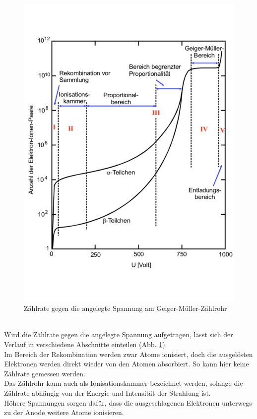 \begin{figure}[h!]
  \centering
  \includegraphics[width=\textwidth]{703charakteristik.pdf}
  \caption{Zählrate gegen die angelegte Spannung am Geiger-Müller-Zählrohr \cite{1}}
  \label{fig:charakteristik}
\end{figure}
\\Wird die Zählrate gegen die angelegte Spannung aufgetragen, lässt sich der Verlauf in verschiedene Abschnitte einteilen (Abb. \ref{fig:charakteristik}).
\\Im Bereich der Rekombination werden zwar Atome ionisiert, doch die ausgelösten Elektronen werden direkt wieder von den Atomen absorbiert.
So kann hier keine Zählrate gemessen werden.
\\Das Zählrohr kann auch als Ionisationskammer bezeichnet werden, solange die Zählrate abhängig von der Energie und Intensität der Strahlung ist.
\\Höhere Spannungen sorgen dafür, dass die ausgeschlagenen Elektronen unterwegs zu der Anode weitere Atome ionisieren.
